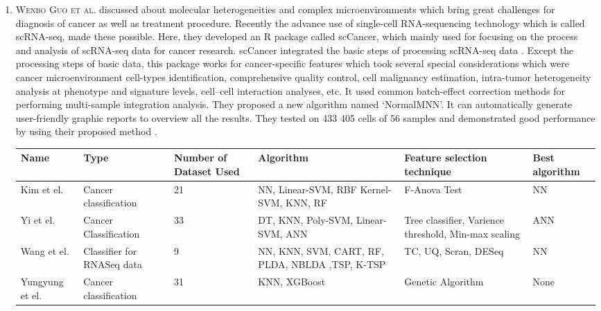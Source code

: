 \begin{enumerate}
  \item \textsc{Wenbo Guo et al.} discussed about molecular heterogeneities and complex microenvironments which bring great challenges for diagnosis of cancer as well as treatment procedure. Recently the advance use of single-cell RNA-sequencing technology which is called scRNA-seq, made these possible. Here, they developed an R package called scCancer, which mainly used for  focusing on the process and analysis of scRNA-seq data for cancer research.  scCancer integrated the  basic steps of processing scRNA-seq data . Except the processing steps of basic data, this package works for cancer-specific features which took several special considerations which were cancer microenvironment cell-types identification, comprehensive quality control, cell malignancy estimation, intra-tumor heterogeneity analysis at phenotype and signature levels, cell–cell interaction analyses, etc. It used common batch-effect correction methods for performing multi-sample integration analysis. They proposed a new algorithm named ‘NormalMNN’. It can automatically generate user-friendly graphic reports to overview all the results. They tested on 433 405 cells of 56 samples and demonstrated good performance by using their proposed method \cite{10.1093/bib/bbaa127}.
  
   \begin{table}[H]
    \centering
    \begin{tabular}{|| p{2.1cm} |p{2.1cm} |p{2.1cm} |p{1.5cm}|p{2.1cm} | p{2.1cm}||}
    \hline\hline
     Name & Type & Number of Dataset Used & Algorithm & Feature selection technique & Best algorithm \\
     \hline
     Kim et el. \cite{10.1093/bioinformatics/btz772} & Cancer classification & 21 & NN, Linear-SVM, RBF Kernel- SVM, KNN, RF & F-Anova Test & NN  \\
      \hline
      Yi et el. \cite{pmid30441551} & Cancer Classification & 33 & DT,  KNN,  Poly-SVM, Linear-SVM, ANN &Tree classifier, Varience threshold, Min-max scaling & ANN  \\ 
     \hline
     Wang et el. \cite{10.1093/bioinformatics/btz801} & Classifier for RNASeq data
 & 9 & NN, KNN, SVM, CART, RF, PLDA, NBLDA ,TSP, K-TSP & TC, UQ, Scran, DESeq & NN \\
     \hline
    
     
     Yungyung et el. \cite{pmid28673244} & Cancer classification & 31 & KNN, XGBoost & Genetic Algorithm & None \\
     \hline
    

\end{tabular}
\end{table}
\end{enumerate}
